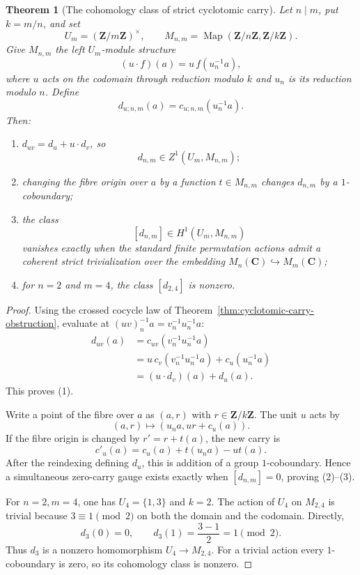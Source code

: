 \documentclass[11pt]{amsart}
\numberwithin{equation}{section}
\newtheorem{theorem}{Theorem}[section]
\theoremstyle{definition}
\newcommand{\Z}{\mathbf Z}
\newcommand{\C}{\mathbf C}
\begin{document}
\begin{theorem}[The cohomology class of strict cyclotomic carry]
\label{thm:cyclotomic-carry-class}
Let $n\mid m$, put $k=m/n$, and set
\[
U_m=(\Z/m\Z)^\times,
\qquad
M_{n,m}=\operatorname{Map}(\Z/n\Z,\Z/k\Z).
\]
Give $M_{n,m}$ the left $U_m$-module structure
\[
(u\cdot f)(a)=u\,f(u_n^{-1}a),
\]
where $u$ acts on the codomain through reduction modulo $k$ and $u_n$ is
its reduction modulo $n$.  Define
\[
d_{u;n,m}(a)=c_{u;n,m}(u_n^{-1}a).
\]
Then:
\begin{enumerate}[label=\textup{(\arabic*)}]
\item $d_{uv}=d_u+u\cdot d_v$, so
\[
d_{n,m}\in Z^1(U_m,M_{n,m});
\]
\item changing the fibre origin over $a$ by a function
$t\in M_{n,m}$ changes $d_{n,m}$ by a $1$-coboundary;
\item the class
\[
[d_{n,m}]\in H^1(U_m,M_{n,m})
\]
vanishes exactly when the standard finite permutation actions admit a
coherent strict trivialization over the embedding
$M_n(\C)\hookrightarrow M_m(\C)$;
\item for $n=2$ and $m=4$, the class $[d_{2,4}]$ is nonzero.
\end{enumerate}
\end{theorem}

\begin{proof}
Using the crossed cocycle law of
Theorem~\ref{thm:cyclotomic-carry-obstruction}, evaluate at
$(uv)_n^{-1}a=v_n^{-1}u_n^{-1}a$:
\[
\begin{aligned}
d_{uv}(a)
&=c_{uv}(v_n^{-1}u_n^{-1}a)\\
&=u\,c_v(v_n^{-1}u_n^{-1}a)
  +c_u(u_n^{-1}a)\\
&=(u\cdot d_v)(a)+d_u(a).
\end{aligned}
\]
This proves (1).

Write a point of the fibre over $a$ as $(a,r)$ with
$r\in\Z/k\Z$.  The unit $u$ acts by
\[
(a,r)\longmapsto(u_na,ur+c_u(a)).
\]
If the fibre origin is changed by $r'=r+t(a)$, the new carry is
\[
c'_u(a)=c_u(a)+t(u_na)-u t(a).
\]
After the reindexing defining $d_u$, this is addition of a group
$1$-coboundary.  Hence a simultaneous zero-carry gauge exists exactly when
$[d_{n,m}]=0$, proving (2)--(3).

For $n=2,m=4$, one has $U_4=\{1,3\}$ and $k=2$.  The action of $U_4$ on
$M_{2,4}$ is trivial because $3\equiv1\pmod2$ on both the domain and the
codomain.  Directly,
\[
d_3(0)=0,
\qquad
d_3(1)=\frac{3-1}{2}=1\pmod2.
\]
Thus $d_3$ is a nonzero homomorphism $U_4\to M_{2,4}$.  For a trivial
action every $1$-coboundary is zero, so its cohomology class is nonzero.
\end{proof}
\end{document}
